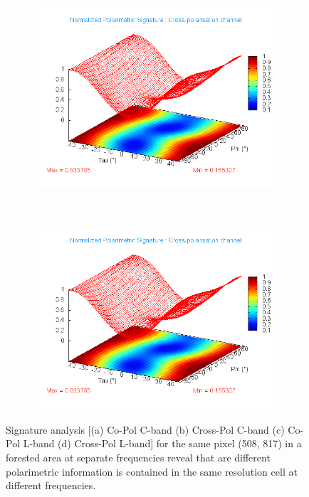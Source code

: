 \begin{figure}[tp]
\begin{subfigure}[b]{0.45\textwidth}
				\includegraphics[width=\textwidth]{Figures/Extra/Signature/L/CopolSignature_50_630_lin}
				\label{fig:a56872}
				\caption{}
	\end{subfigure}
	~
	\begin{subfigure}[b]{0.45\textwidth}
		\includegraphics[width=\textwidth]{Figures/Extra/Signature/L/CopolSignature_50_630_lin}
		\label{fig:a5687}
		\caption{}
	\end{subfigure}
	\caption{ Signature analysis [(a) Co-Pol C-band (b) Cross-Pol C-band (c) Co-Pol L-band (d) Cross-Pol L-band] for the same pixel (508, 817) in a forested area at separate frequencies reveal that are different polarimetric information is contained in the same resolution cell at different frequencies.  }
	\label{fig:a456Sign}
\end{figure}




